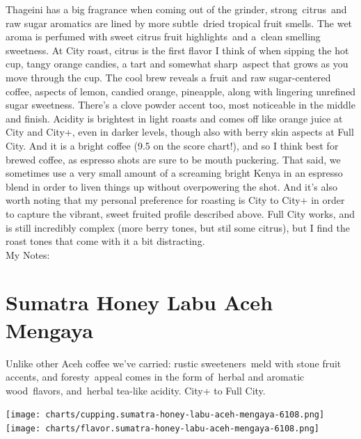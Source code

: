 \documentclass[10pt,twoside,footinclude=true,headinclude=true]{scrbook} %
\begin{document}
Thageini has a big fragrance when coming out of the grinder, strong citrus and raw sugar aromatics are lined by more subtle dried tropical fruit smells. The wet aroma is perfumed with sweet citrus fruit highlights and a clean smelling sweetness. At City roast, citrus is the first flavor I think of when sipping the hot cup, tangy orange candies, a tart and somewhat sharp aspect that grows as you move through the cup. The cool brew reveals a fruit and raw sugar-centered coffee, aspects of lemon, candied orange, pineapple, along with lingering unrefined sugar sweetness. There's a clove powder accent too, most noticeable in the middle and finish. Acidity is brightest in light roasts and comes off like orange juice at City and City+, even in darker levels, though also with berry skin aspects at Full City. And it is a bright coffee (9.5 on the score chart!), and so I think best for brewed coffee, as espresso shots are sure to be mouth puckering. That said, we sometimes use a very small amount of a screaming bright Kenya in an espresso blend in order to liven things up without overpowering the shot. And it's also worth noting that my personal preference for roasting is City to City+ in order to capture the vibrant, sweet fruited profile described above. Full City works, and is still incredibly complex (more berry tones, but stil some citrus), but I find the roast tones that come with it a bit distracting. \\
\medskip
\normalsize
My Notes:


\chapter*{Sumatra Honey Labu Aceh Mengaya}
 
\begin{addmargin}[2.2em]{2.2em}
\small
\justify
Unlike other Aceh coffee we've carried: rustic sweeteners meld with stone fruit accents, and foresty appeal comes in the form of herbal and aromatic wood flavors, and herbal tea-like acidity. City+ to Full City.
\end{addmargin}

\centering
\vspace{2em}
\texttt{[image: charts/cupping.sumatra-honey-labu-aceh-mengaya-6108.png]}
\texttt{[image: charts/flavor.sumatra-honey-labu-aceh-mengaya-6108.png]}
\end{document}
